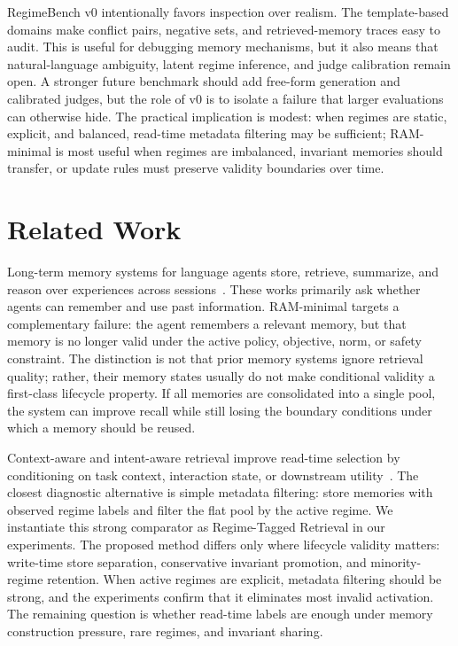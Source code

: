 \documentclass{article} %
\begin{document}
RegimeBench v0 intentionally favors inspection over realism.
The template-based domains make conflict pairs, negative sets, and retrieved-memory traces easy to audit.
This is useful for debugging memory mechanisms, but it also means that natural-language ambiguity, latent regime inference, and judge calibration remain open.
A stronger future benchmark should add free-form generation and calibrated judges, but the role of v0 is to isolate a failure that larger evaluations can otherwise hide.
The practical implication is modest: when regimes are static, explicit, and balanced, read-time metadata filtering may be sufficient; RAM-minimal is most useful when regimes are imbalanced, invariant memories should transfer, or update rules must preserve validity boundaries over time.

\section{Related Work}
\label{sec:related_work}

Long-term memory systems for language agents store, retrieve, summarize, and reason over experiences across sessions~\citep{park2023generative,packer2023memgpt,sumers2023coala,wu2024longmemeval}.
These works primarily ask whether agents can remember and use past information.
RAM-minimal targets a complementary failure: the agent remembers a relevant memory, but that memory is no longer valid under the active policy, objective, norm, or safety constraint.
The distinction is not that prior memory systems ignore retrieval quality; rather, their memory states usually do not make conditional validity a first-class lifecycle property.
If all memories are consolidated into a single pool, the system can improve recall while still losing the boundary conditions under which a memory should be reused.

Context-aware and intent-aware retrieval improve read-time selection by conditioning on task context, interaction state, or downstream utility~\citep{xu2025amem,utilityrag2025,influencecontext2025}.
The closest diagnostic alternative is simple metadata filtering: store memories with observed regime labels and filter the flat pool by the active regime.
We instantiate this strong comparator as Regime-Tagged Retrieval in our experiments.
The proposed method differs only where lifecycle validity matters: write-time store separation, conservative invariant promotion, and minority-regime retention.
When active regimes are explicit, metadata filtering should be strong, and the experiments confirm that it eliminates most invalid activation.
The remaining question is whether read-time labels are enough under memory construction pressure, rare regimes, and invariant sharing.
\end{document}
